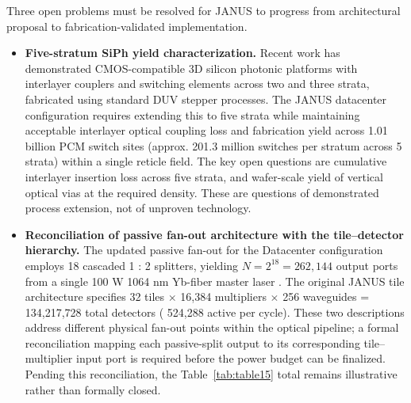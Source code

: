 \documentclass[journal]{IEEEtran}
\begin{document}
Three open problems must be resolved for JANUS to progress from architectural proposal to fabrication-validated implementation.
\begin{itemize}
\item  \textbf{Five-stratum SiPh yield characterization.} Recent work has demonstrated CMOS-compatible 3D silicon photonic platforms with interlayer couplers and switching elements across two and three strata, fabricated using standard DUV stepper processes. The JANUS datacenter configuration requires extending this to five strata while maintaining acceptable interlayer optical coupling loss and fabrication yield across 1.01 billion PCM switch sites (approx. 201.3 million switches per stratum across 5 strata) within a single reticle field. The key open questions are cumulative interlayer insertion loss across five strata, and wafer-scale yield of vertical optical vias at the required density. These are questions of demonstrated process extension, not of unproven technology.
\item  \textbf{Reconciliation of passive fan-out architecture with the tile--detector hierarchy.} The updated passive fan-out for the Datacenter configuration employs 18 cascaded 1 : 2 splitters, yielding $N = 2^{18} = 262,144$ output ports from a single 100 W 1064 nm Yb-fiber master laser \cite{Jeong2004}. The original JANUS tile architecture specifies 32 tiles $\times$ 16,384 multipliers $\times$ 256 waveguides = 134,217,728 total detectors ( 524,288 active per cycle). These two descriptions address different physical fan-out points within the optical pipeline; a formal reconciliation mapping each passive-split output to its corresponding tile--multiplier input port is required before the power budget can be finalized. Pending this reconciliation, the Table~\ref{tab:table15} total remains illustrative rather than formally closed.


\end{itemize}
\end{document}
